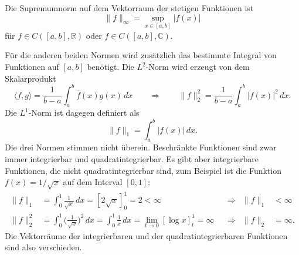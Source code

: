Die Supremumnorm auf dem Vektorraum der stetigen Funktionen ist
%
\[
\|f\|_\infty = \sup_{x\in[a,b]} |f(x)|
\]
für $f\in C([a,b],\mathbb{R})$ oder $f\in C([a,b],\mathbb{C})$.

Für die anderen beiden Normen wird zusätzlich das bestimmte Integral
von Funktionen auf $[a,b]$ benötigt.
Die $L^2$-Norm wird erzeugt von dem Skalarprodukt
%
%
\[
\langle f,g\rangle
=
\frac{1}{b-a}
\int_a^b \overline{f}(x)g(x)\,dx
\qquad\Rightarrow\qquad
\|f\|_2^2 = \frac{1}{b-a}\int_a^b |f(x)|^2\,dx.
\]
Die $L^1$-Norm ist dagegen definiert als
\[
\|f\|_1
=
\int_a^b |f(x)|\,dx.
\]
Die drei Normen stimmen nicht überein.
Beschränkte Funktionen sind zwar immer integrierbar und quadratintegrierbar.
Es gibt aber integrierbare Funktionen, die nicht quadratintegrierbar sind, zum
Beispiel ist die Funktion $f(x)=1/\sqrt{x}$ auf dem Interval $[0,1]$:
\begin{align*}
\|f\|_1
&=
\int_0^1 \frac 1{\sqrt{x}}\,dx
=
[2\sqrt{x}]_0^1
=
2
<
\infty
&&\Rightarrow& \|f\|_1&<\infty
\\
\|f\|_2^2
&=
\int_0^1 \biggl(\frac1{\sqrt{x}}\biggr)^2\,dx
=
\int_0^1 \frac1x\,dx
=
\lim_{t\to 0} [\log x]_t^1 = \infty
&&\Rightarrow&
\|f\|_2 &= \infty.
\end{align*}
Die Vektorräume der integrierbaren und der quadratintegrierbaren Funktionen
sind also verschieden.

